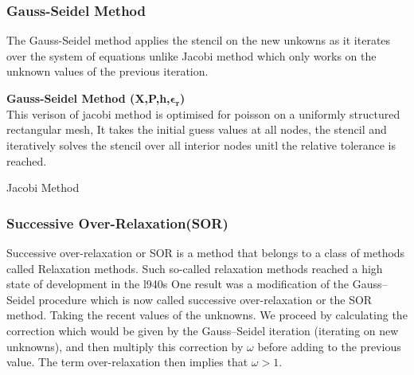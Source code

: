 \subsubsection{Gauss-Seidel Method}
The Gauss-Seidel method applies the stencil on the new unkowns as it iterates over the system of equations unlike Jacobi method which only works on the unknown values of the previous iteration.\\[2mm]
\begin{algorithm}[H]
    \textbf{Gauss-Seidel Method (X,P,h,$\mathbf{\epsilon_r}$)}\\[-1pt]
    This verison of jacobi method is optimised for poisson on a uniformly structured rectangular mesh, It takes the initial guess values at all nodes, the stencil and iteratively solves the stencil over all interior nodes unitl the relative tolerance is reached.  \\[2mm]
    \caption{Jacobi Method}
\end{algorithm}


\subsubsection{Successive Over-Relaxation(SOR)}
Successive over-relaxation or SOR is a method that belongs to a class of methods called Relaxation methods. 
Such so-called relaxation methods reached a high state of development in the l940s One result was a modiﬁcation of the Gauss–Seidel procedure which is now called successive over-relaxation or the SOR method.
Taking the recent values of the unknowns. We proceed by calculating the correction which would be given by the Gauss–Seidel iteration (iterating on new unknowns), and then multiply this correction by $\omega$ before adding to the previous value. The term over-relaxation then implies that $\omega>1$. \\[2mm]

